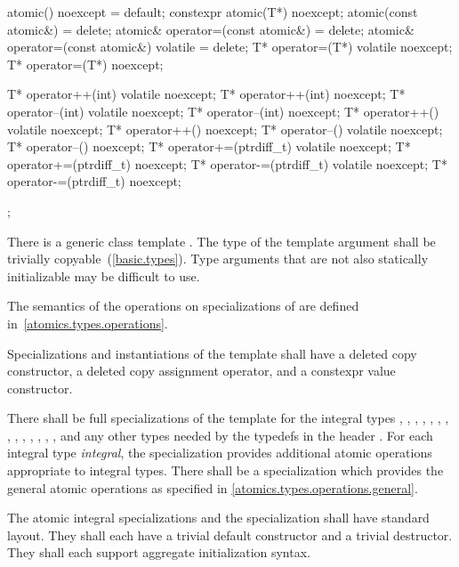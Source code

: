 \begin{codeblock}
{{    atomic() noexcept = default;
    constexpr atomic(T*) noexcept;
    atomic(const atomic&) = delete;
    atomic& operator=(const atomic&) = delete;
    atomic& operator=(const atomic&) volatile = delete;
    T* operator=(T*) volatile noexcept;
    T* operator=(T*) noexcept;

    T* operator++(int) volatile noexcept;
    T* operator++(int) noexcept;
    T* operator--(int) volatile noexcept;
    T* operator--(int) noexcept;
    T* operator++() volatile noexcept;
    T* operator++() noexcept;
    T* operator--() volatile noexcept;
    T* operator--() noexcept;
    T* operator+=(ptrdiff_t) volatile noexcept;
    T* operator+=(ptrdiff_t) noexcept;
    T* operator-=(ptrdiff_t) volatile noexcept;
    T* operator-=(ptrdiff_t) noexcept;
  };
}
\end{codeblock}

\pnum
There is a generic class template . The type of the template argument
 shall be trivially copyable~(\ref{basic.types}). \enternote Type arguments that are
not also statically initializable may be difficult to use. \exitnote

\pnum
The semantics of the operations on specializations of  are defined
in~\ref{atomics.types.operations}.

\pnum
Specializations and instantiations of the  template shall have a deleted copy constructor, a deleted
copy assignment operator, and a constexpr value constructor.

\pnum
There shall be full specializations of the 
template for the integral types
,
,
,
,
,
,
,
,
,
,
,
,
,
,
and any other types needed by the typedefs in the header .
For each integral type \textit{integral}, the specialization
 provides additional atomic operations appropriate to integral types.
There shall be a specialization  which provides the general
atomic operations as specified in \ref{atomics.types.operations.general}.

\pnum
The atomic integral specializations and the specialization 
shall have standard layout. They shall each have a trivial default constructor
and a trivial destructor. They shall each support aggregate initialization
syntax.

